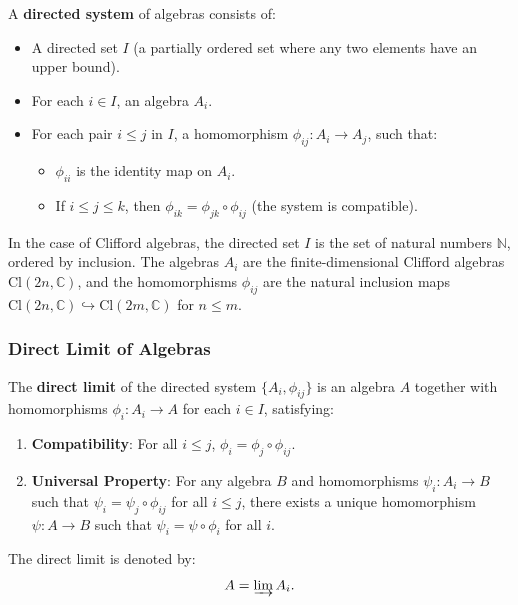 \documentclass{article}
\begin{document}
A \textbf{directed system} of algebras consists of:

\begin{itemize}
\item A directed set $I$ (a partially ordered set where any two elements
have an upper bound). 

\item For each $i \in I$, an algebra $A_i$. 

\item For each pair $i \leq j$ in $I$, a homomorphism $\phi_{ij}: A_i \to A_j
$, such that: 

\begin{itemize}
\item $\phi_{ii}$ is the identity map on $A_i$. 

\item If $i \leq j \leq k$, then $\phi_{ik} = \phi_{jk} \circ \phi_{ij}$
(the system is compatible). 
\end{itemize}
\end{itemize}

In the case of Clifford algebras, the directed set $I$ is the set of natural
numbers $\mathbb{N}$, ordered by inclusion. The algebras $A_i$ are the
finite-dimensional Clifford algebras $\text{Cl}(2n, \mathbb{C})$, and the
homomorphisms $\phi_{ij}$ are the natural inclusion maps $\text{Cl}(2n, 
\mathbb{C}) \hookrightarrow \text{Cl}(2m, \mathbb{C})$ for $n \leq m$.

\subsubsection{Direct Limit of Algebras}

The \textbf{direct limit} of the directed system $\{A_i, \phi_{ij}\}$ is an
algebra $A$ together with homomorphisms $\phi_i: A_i \to A$ for each $i \in I
$, satisfying:

\begin{enumerate}
\item \textbf{Compatibility}: For all $i \leq j$, $\phi_i = \phi_j \circ
\phi_{ij}$. 

\item \textbf{Universal Property}: For any algebra $B$ and homomorphisms $%
\psi_i: A_i \to B$ such that $\psi_i = \psi_j \circ \phi_{ij}$ for all $i
\leq j$, there exists a unique homomorphism $\psi: A \to B$ such that $%
\psi_i = \psi \circ \phi_i$ for all $i$.
\end{enumerate}

The direct limit is denoted by: 
\begin{equation*}
A = \varinjlim A_i. 
\end{equation*}
\end{document}

